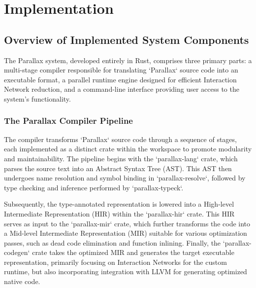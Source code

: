 \chapter{Implementation}

\section{Overview of Implemented System Components} %

The Parallax system, developed entirely in Rust, comprises three primary parts: a multi-stage compiler responsible for translating `Parallax` source code into an executable format, a parallel runtime engine designed for efficient Interaction Network reduction, and a command-line interface providing user access to the system's functionality.

\subsection{The Parallax Compiler Pipeline} %
The compiler transforms `Parallax` source code through a sequence of stages, each implemented as a distinct crate within the workspace to promote modularity and maintainability. The pipeline begins with the `parallax-lang` crate, which parses the source text into an Abstract Syntax Tree (AST). This AST then undergoes name resolution and symbol binding in `parallax-resolve`, followed by type checking and inference performed by `parallax-typeck`. 

Subsequently, the type-annotated representation is lowered into a High-level Intermediate Representation (HIR) within the `parallax-hir` crate. This HIR serves as input to the `parallax-mir` crate, which further transforms the code into a Mid-level Intermediate Representation (MIR) suitable for various optimization passes, such as dead code elimination and function inlining. Finally, the `parallax-codegen` crate takes the optimized MIR and generates the target executable representation, primarily focusing on Interaction Networks for the custom runtime, but also incorporating integration with LLVM for generating optimized native code.

